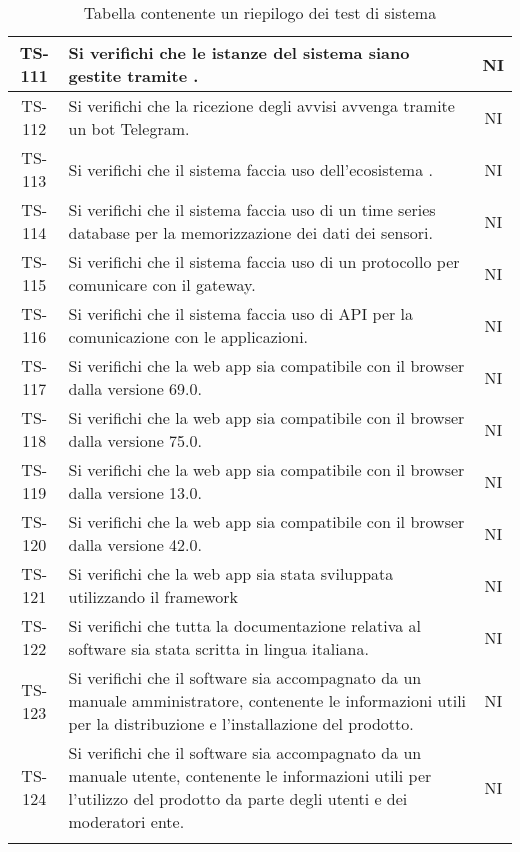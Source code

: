\begin{center}
\begin{longtable}{|c|p{10cm}|c|}
			 TS-111 & Si verifichi che le istanze del sistema siano gestite tramite \glock{Docker}. & NI \\
			 \hline
			 TS-112 & Si verifichi che la ricezione degli avvisi avvenga tramite un bot Telegram. & NI \\
			 \hline
			 TS-113 & Si verifichi che il sistema faccia uso dell'ecosistema \glock{Kafka}. & NI \\
			 \hline
			 TS-114 & Si verifichi che il sistema faccia uso di un time series database per la memorizzazione dei dati dei sensori. & NI \\
			 \hline
			 TS-115 & Si verifichi che il sistema faccia uso di un protocollo per comunicare con il gateway. & NI \\
			 \hline
			 TS-116 & Si verifichi che il sistema faccia uso di API per la comunicazione con le applicazioni. & NI \\
			 \hline
			 TS-117 & Si verifichi che la web app sia compatibile con il browser \glock{Firefox} dalla versione 69.0. & NI \\
			 \hline
			 TS-118 & Si verifichi che la web app sia compatibile con il browser \glock{Chrome} dalla versione 75.0. & NI \\
			 \hline
			 TS-119 & Si verifichi che la web app sia compatibile con il browser \glock{Safari} dalla versione 13.0. & NI \\
			 \hline
			 TS-120 & Si verifichi che la web app sia compatibile con il browser \glock{Edge} dalla versione 42.0. & NI \\
			 \hline
			 TS-121 & Si verifichi che la web app sia stata sviluppata utilizzando il framework \glock{Bootstrap} & NI \\
			 \hline
			 TS-122 & Si verifichi che tutta la documentazione relativa al software sia stata scritta in lingua italiana. & NI \\
			 \hline
			 TS-123 & Si verifichi che il software sia accompagnato da un manuale amministratore, contenente le informazioni utili per la distribuzione e l'installazione del prodotto. & NI \\
			 \hline
			 TS-124 & Si verifichi che il software sia accompagnato da un manuale utente, contenente le informazioni utili per l'utilizzo del prodotto da parte degli utenti e dei moderatori ente. & NI \\
			 \hline

			 \caption{Tabella contenente un riepilogo dei test di sistema}
			\end{longtable}
		\end{center}
		
